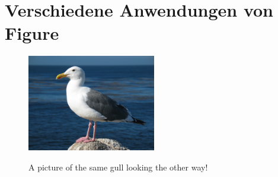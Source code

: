 \documentclass[10pt, a4paper]{article}
\begin{document}
\listoffigures
\newpage
\section{Verschiedene Anwendungen von Figure}


\begin{figure}[h]
\centering
  \includegraphics[width=0.5\textwidth]{gull_picture}
\end{figure}

\begin{figure}[h]
  \centering
  \caption{A picture of the same gull
           looking the other way!}
\end{figure}
\newpage

\end{document}
